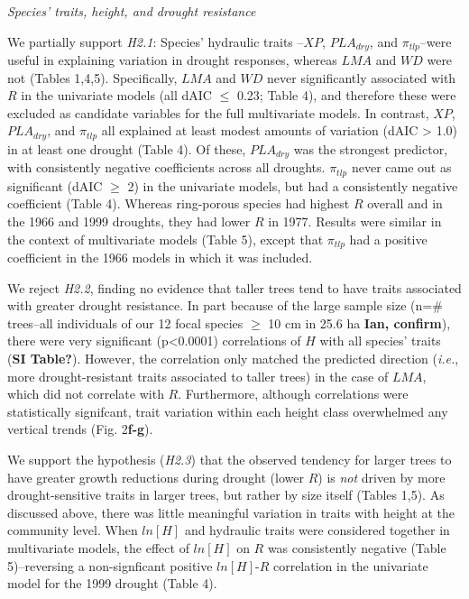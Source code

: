 \documentclass[]{article}
\begin{document}
\emph{Species' traits, height, and drought resistance}

We partially support \emph{H2.1}: Species' hydraulic traits --\(XP\),
\(PLA_{dry}\), and \(\pi_{tlp}\)--were useful in explaining variation in
drought responses, whereas \(LMA\) and \(WD\) were not (Tables 1,4,5).
Specifically, \(LMA\) and \(WD\) never significantly associated with
\(R\) in the univariate models (all dAIC \(\le\) 0.23; Table 4), and
therefore these were excluded as candidate variables for the full
multivariate models. In contrast, \(XP\), \(PLA_{dry}\), and
\(\pi_{tlp}\) all explained at least modest amounts of variation (dAIC
\textgreater{} 1.0) in at least one drought (Table 4). Of these,
\(PLA_{dry}\) was the strongest predictor, with consistently negative
coefficients across all droughts. \(\pi_{tlp}\) never came out as
significant (dAIC \(\ge\) 2) in the univariate models, but had a
consistently negative coefficient (Table 4). Whereas ring-porous species
had highest \(R\) overall and in the 1966 and 1999 droughts, they had
lower \(R\) in 1977. Results were similar in the context of multivariate
models (Table 5), except that \(\pi_{tlp}\) had a positive coefficient
in the 1966 models in which it was included.

We reject \emph{H2.2}, finding no evidence that taller trees tend to
have traits associated with greater drought resistance. In part because
of the large sample size (n=\# trees--all individuals of our 12 focal
species \(\ge\) 10 cm in 25.6 ha \textbf{Ian, confirm}), there were very
significant (p\textless{}0.0001) correlations of \(H\) with all species'
traits (\textbf{SI Table?}). However, the correlation only matched the
predicted direction (\emph{i.e.}, more drought-resistant traits
associated to taller trees) in the case of \(LMA\), which did not
correlate with \(R\). Furthermore, although correlations were
statistically signifcant, trait variation within each height class
overwhelmed any vertical trends (Fig. 2\textbf{f-g}).

We support the hypothesis (\emph{H2.3}) that the observed tendency for
larger trees to have greater growth reductions during drought (lower
\(R\)) is \emph{not} driven by more drought-sensitive traits in larger
trees, but rather by size itself (Tables 1,5). As discussed above, there
was little meaningful variation in traits with height at the community
level. When \(ln[H]\) and hydraulic traits were considered together in
multivariate models, the effect of \(ln[H]\) on \(R\) was consistently
negative (Table 5)--reversing a non-signficant positive \(ln[H]\)-\(R\)
correlation in the univariate model for the 1999 drought (Table 4).
\end{document}
